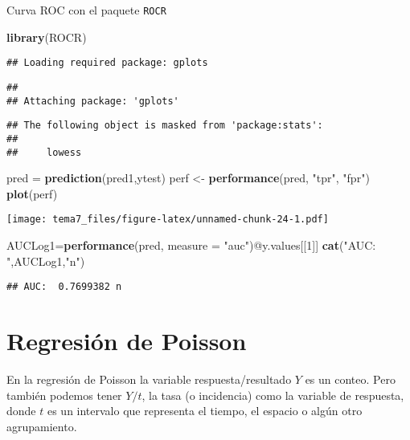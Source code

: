 \documentclass[]{article}
\newenvironment{Shaded}{\begin{snugshade}}{\end{snugshade}}
\newcommand{\KeywordTok}[1]{\textcolor[rgb]{0.13,0.29,0.53}{\textbf{{#1}}}}
\newcommand{\DataTypeTok}[1]{\textcolor[rgb]{0.13,0.29,0.53}{{#1}}}
\newcommand{\DecValTok}[1]{\textcolor[rgb]{0.00,0.00,0.81}{{#1}}}
\newcommand{\StringTok}[1]{\textcolor[rgb]{0.31,0.60,0.02}{{#1}}}
\newcommand{\NormalTok}[1]{{#1}}
\numberwithin{equation}{section}
\begin{document}
Curva ROC con el paquete \texttt{ROCR}

\begin{Shaded}
\begin{Highlighting}[]
\KeywordTok{library}\NormalTok{(ROCR)}
\end{Highlighting}
\end{Shaded}

\begin{verbatim}
## Loading required package: gplots
\end{verbatim}

\begin{verbatim}
## 
## Attaching package: 'gplots'
\end{verbatim}

\begin{verbatim}
## The following object is masked from 'package:stats':
## 
##     lowess
\end{verbatim}

\begin{Shaded}
\begin{Highlighting}[]
\NormalTok{pred =}\StringTok{ }\KeywordTok{prediction}\NormalTok{(pred1,ytest)}
\NormalTok{perf <-}\StringTok{ }\KeywordTok{performance}\NormalTok{(pred, }\StringTok{"tpr"}\NormalTok{, }\StringTok{"fpr"}\NormalTok{)}
\KeywordTok{plot}\NormalTok{(perf)}
\end{Highlighting}
\end{Shaded}

\texttt{[image: tema7\_files/figure-latex/unnamed-chunk-24-1.pdf]}

\begin{Shaded}
\begin{Highlighting}[]
\NormalTok{AUCLog1=}\KeywordTok{performance}\NormalTok{(pred, }\DataTypeTok{measure =} \StringTok{"auc"}\NormalTok{)@y.values[[}\DecValTok{1}\NormalTok{]]}
\KeywordTok{cat}\NormalTok{(}\StringTok{"AUC: "}\NormalTok{,AUCLog1,}\StringTok{"n"}\NormalTok{)}
\end{Highlighting}
\end{Shaded}

\begin{verbatim}
## AUC:  0.7699382 n
\end{verbatim}

\section{Regresión de Poisson}\label{regresion-de-poisson}

En la regresión de Poisson la variable respuesta/resultado \(Y\) es un
conteo. Pero también podemos tener \(Y/t\), la tasa (o incidencia) como
la variable de respuesta, donde \(t\) es un intervalo que representa el
tiempo, el espacio o algún otro agrupamiento.
\end{document}
